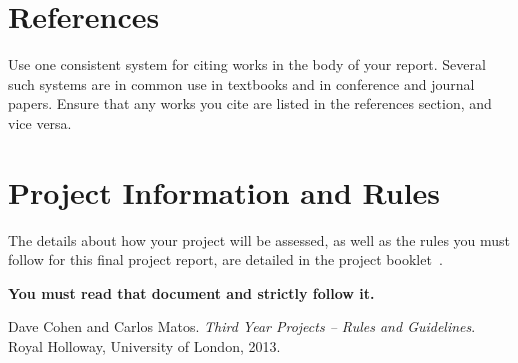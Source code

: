 \documentclass[]{final_report}
\begin{document}
\chapter{References}

Use one consistent system for citing works in the body of your report. Several such systems are in common use in textbooks and in conference and journal papers. Ensure that any works you cite are listed in the references section, and vice versa. 

\chapter{Project Information and Rules}

The details about how your project will be assessed, as well as the rules you must follow for this final project report, are detailed in the project booklet~\cite{COHEN:2013}.

\textbf{You must read that document and strictly follow it.}


\newpage
\begin{thebibliography}{99}
 Dave Cohen and Carlos Matos. \emph{Third Year Projects -- Rules and Guidelines}. Royal Holloway, University of London, 2013.
\end{thebibliography}
\label{endpage}
\end{document}
